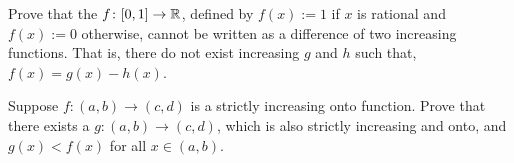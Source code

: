 \begin{exercise}
Prove that the 
$f \colon [0,1] \to{\mathbb{R}}$, defined by $f(x) :=
1$ if $x$ is rational and $f(x) := 0$ otherwise, cannot be written as a
difference of two increasing functions.  That is, there do not exist
increasing $g$ and $h$ such that, $f(x) = g(x) - h(x)$.
\end{exercise}

\begin{exercise}
Suppose $f \colon (a,b) \to (c,d)$ is a strictly increasing
onto function.  Prove that there exists a $g \colon (a,b) \to (c,d)$,
which is also strictly increasing and onto, and $g(x) < f(x)$ for all $x \in
(a,b)$.
\end{exercise}


